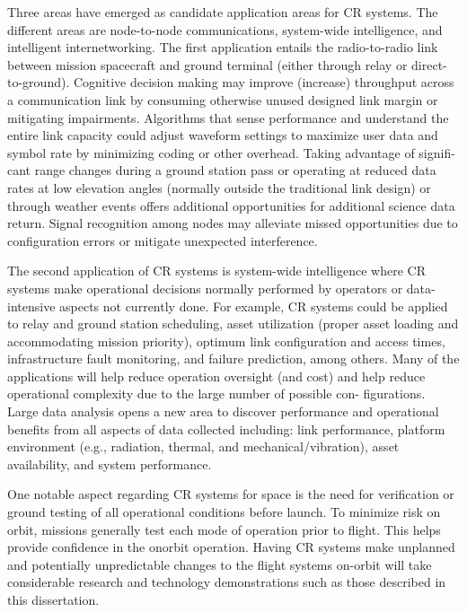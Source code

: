 \documentclass[11pt]{report}
\begin{document}
	\textbf{}\par Three areas have emerged as candidate application areas for CR systems. The different areas are node-to-node communications, system-wide intelligence, and intelligent internetworking. The first application entails the radio-to-radio link between mission spacecraft
	and ground terminal (either through relay or direct-to-ground). Cognitive decision making may improve (increase) throughput across a communication link by consuming otherwise unused designed link margin or mitigating impairments. Algorithms that sense performance
	and understand the entire link capacity could adjust waveform settings to maximize user data and symbol rate by minimizing coding or other overhead. Taking advantage of signifi-cant range changes during a ground station pass or operating at reduced data rates at low
	elevation angles (normally outside the traditional link design) or through weather events offers additional opportunities for additional science data return. Signal recognition among nodes may alleviate missed opportunities due to configuration errors or mitigate unexpected
	interference.
	\par The second application of CR systems is system-wide intelligence where CR systems make operational decisions normally performed by operators or data-intensive aspects not currently done. For example, CR systems could be applied to relay and ground station scheduling, asset utilization (proper asset loading and accommodating mission priority), optimum link configuration and access times, infrastructure fault monitoring, and failure prediction, among others. Many of the applications will help reduce operation oversight (and cost) and help reduce operational complexity due to the large number of possible con-
	figurations. Large data analysis opens a new area to discover  performance and operational benefits from all aspects of data collected including: link performance, platform environment (e.g., radiation, thermal, and mechanical/vibration), asset availability, and system performance.
	\par One notable aspect regarding CR systems for space is the need for verification or ground testing of all operational conditions before launch. To minimize risk on orbit, missions generally test each mode of operation prior to flight. This helps provide confidence in the onorbit
	operation. Having CR systems make unplanned and potentially unpredictable changes to the flight systems on-orbit will take considerable research and technology demonstrations such as those described in this dissertation.
	
\end{document}
